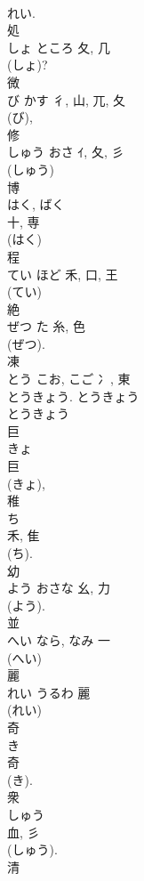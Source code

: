 \documentclass[8pt]{extreport}
\begin{document}
\begin{CJK}{UTF8}{min}
\\	れい.
\\	処	
\\	しょ	ところ	夂, 几	
\\	(しょ)? 
\\	微	
\\	び	かす	彳, 山, 兀, 夂	
\\	(び), 
\\	修	
\\	しゅう	おさ	ｲ, 夂, 彡		
\\	(しゅう) 
\\	博	
\\	はく, ばく	
\\	十, 専	
\\	(はく) 
\\	程	
\\	てい	ほど	禾, 口, 王	
\\	(てい) 
\\	絶	
\\	ぜつ	た	糸, 色	
\\	(ぜつ). 
\\	凍	
\\	とう	こお, こご	冫, 東	
\\	とうきょう. とうきょう 
\\	とうきょう 
\\	巨	
\\	きょ	
\\	巨	
\\	(きょ), 
\\	稚	
\\	ち	
\\	禾, 隹	
\\	(ち). 
\\	幼	
\\	よう	おさな	幺, 力	
\\	(よう). 
\\	並	
\\	へい	なら, なみ	一	
\\	(へい) 
\\	麗	
\\	れい	うるわ	麗	
\\	(れい) 
\\	奇	
\\	き	
\\	奇	
\\	(き).	
\\	衆	
\\	しゅう	
\\	血, 彡		
\\	(しゅう). 
\\	清	

\end{CJK}
\end{document}
